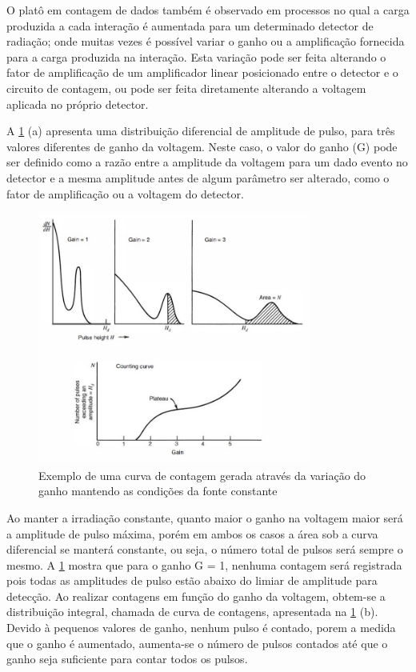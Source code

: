 \documentclass[11pt,a4paper]{article}
\begin{document}
		O platô em contagem de dados também é observado em processos no qual a carga produzida a cada interação é aumentada para um determinado detector de radiação; onde muitas vezes é possível variar o ganho ou a amplificação fornecida para a carga produzida na interação. Esta variação pode ser feita alterando o fator de amplificação de um amplificador linear posicionado entre o detector e o circuito de contagem, ou pode ser feita diretamente alterando a voltagem aplicada no próprio detector. 

		A  \ref{fig:curvaContagemGanho} (a) apresenta uma distribuição diferencial de amplitude de pulso, para três valores diferentes de ganho da voltagem. Neste caso, o valor do ganho (G) pode ser definido como a razão entre a amplitude da voltagem para um dado evento no detector e a mesma amplitude antes de algum parâmetro ser alterado, como o fator de amplificação ou a voltagem do detector. 

			\begin{figure}[h]
				\centering
				\includegraphics[width=0.8\textwidth]{Imagens/curvaContagemGanho.jpg}
				\caption{Exemplo de uma curva de contagem gerada através da variação do ganho mantendo as condições da fonte constante}
				\label{fig:curvaContagemGanho}
			\end{figure}

		
		Ao manter a irradiação constante, quanto maior o ganho na voltagem maior será a amplitude de pulso máxima, porém em ambos os casos a área sob a curva diferencial se manterá constante, ou seja, o número total de pulsos  será sempre o mesmo. A  \ref{fig:curvaContagemGanho} mostra que para o ganho G = 1, nenhuma contagem será registrada pois todas as amplitudes de pulso estão abaixo do limiar de amplitude para detecção. Ao realizar contagens em função do ganho da voltagem, obtem-se a distribuição integral, chamada de curva de contagens, apresentada na  \ref{fig:curvaContagemGanho} (b). Devido à pequenos valores de ganho, nenhum pulso é contado, porem a medida que o ganho é aumentado, aumenta-se o número de pulsos contados até que o ganho seja suficiente para contar todos os pulsos. 
\end{document}
